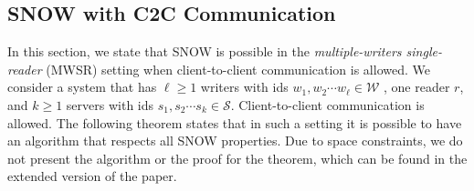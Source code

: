 
\subsection{SNOW with C2C Communication}
 \label{subsec:yes_snow_yes_c2c}
\label{sec:mwsr}
In this section, we state that  SNOW is possible in the   \emph{multiple-writers single-reader} 
(MWSR) setting %
 when client-to-client communication is allowed.  
We consider a system that has $\ell \geq 1$ writers with ids $w_1, 
w_2 \cdots w_{\ell} \in \mathcal{W}$ 
, one reader $r$, and  $k \geq 1$ servers with ids $s_1, s_2\cdots s_k \in \mathcal{S}$. 
Client-to-client communication is allowed. 
%
The following theorem states that in such a setting  it is possible to have an algorithm  that respects all SNOW properties.  Due to space constraints, we do not present the algorithm or the proof for the theorem, {\color{blue} which can be found in the extended version of the paper.} %


		
